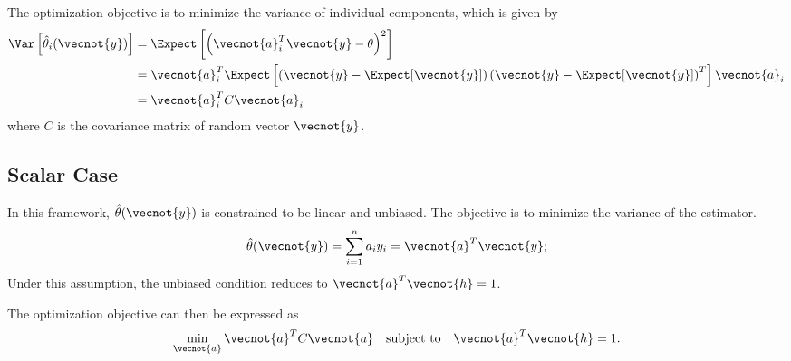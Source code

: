 The optimization objective is to minimize the variance of individual components, which is given by
\begin{equation*}
\begin{split}
\Var \left[ \hat{\theta}_i (\vecnot{y}) \right]
&= \Expect \left[ \left( \vecnot{a}_i^T \vecnot{y} - \theta \right)^2 \right] \\
&= \vecnot{a}_i^T \Expect \left[ \left( \vecnot{y}
- \Expect [\vecnot{y}] \right)
\left( \vecnot{y} - \Expect [\vecnot{y}] \right)^T \right] \vecnot{a}_i \\
&= \vecnot{a}_i^T C \vecnot{a}_i
\end{split}
\end{equation*}
where $C$ is the covariance matrix of random vector $\vecnot{y}$.



\subsection{Scalar Case}

In this framework, $\hat{\theta} (\vecnot{y})$ is constrained to be linear and unbiased.
The objective is to minimize the variance of the estimator.
\begin{equation*}
\hat{\theta} (\vecnot{y}) = \sum_{i=1}^n a_i y_i = \vecnot{a}^T \vecnot{y} ;
\end{equation*}
Under this assumption, the unbiased condition reduces to $\vecnot{a}^T \vecnot{h} = 1$.


The optimization objective can then be expressed as
\begin{equation*}
\min_{\vecnot{a}} \vecnot{a}^T C \vecnot{a} \quad \text{subject to} \quad \vecnot{a}^T \vecnot{h} = 1 .
\end{equation*}

